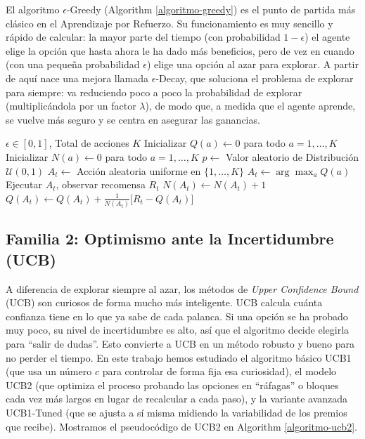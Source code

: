 El algoritmo \(\epsilon\)-Greedy (Algorithm \ref{algoritmo-greedy}) es el punto de
partida más clásico en el Aprendizaje por Refuerzo. Su funcionamiento es
muy sencillo y rápido de calcular: la mayor parte del tiempo (con
probabilidad \(1-\epsilon\)) el agente elige la opción que hasta ahora
le ha dado más beneficios, pero de vez en cuando (con una pequeña
probabilidad \(\epsilon\)) elige una opción al azar para explorar. A
partir de aquí nace una mejora llamada \(\epsilon\)-Decay, que soluciona
el problema de explorar para siempre: va reduciendo poco a poco la
probabilidad de explorar (multiplicándola por un factor \(\lambda\)), de
modo que, a medida que el agente aprende, se vuelve más seguro y se
centra en asegurar las ganancias.

\begin{algorithm}
\caption{Algoritmo $\epsilon$-Greedy para K-Brazos}\label{algoritmo-greedy}
\begin{algorithmic}[1]
\Require $\epsilon \in [0, 1]$, Total de acciones $K$
\State Inicializar $Q(a) \leftarrow 0$ para todo $a=1,\dots, K$
\State Inicializar $N(a) \leftarrow 0$ para todo $a=1,\dots, K$
    \State $p \leftarrow$ Valor aleatorio de Distribución $\mathcal{U}(0, 1)$
        \State $A_t \leftarrow$ Acción aleatoria uniforme en $\{1, \dots, K\}$
    \Else
        \State $A_t \leftarrow \arg\max_a Q(a)$  
    \EndIf
    \State Ejecutar $A_t$, observar recomensa $R_t$
    \State $N(A_t) \leftarrow N(A_t) + 1$
    \State $Q(A_t) \leftarrow Q(A_t) + \frac{1}{N(A_t)} \big[R_t - Q(A_t)\big]$
\EndFor
\end{algorithmic}
\end{algorithm}

\subsection{Familia 2: Optimismo ante la Incertidumbre
(UCB)}\label{familia-2-optimismo-ante-la-incertidumbre-ucb}

A diferencia de explorar siempre al azar, los
métodos de \emph{Upper Confidence Bound} (UCB) son curiosos de forma
mucho más inteligente. UCB calcula cuánta confianza tiene en lo que ya
sabe de cada palanca. Si una opción se ha probado muy poco, su nivel de
incertidumbre es alto, así que el algoritmo decide elegirla para ``salir
de dudas''. Esto convierte a UCB en un método robusto y bueno para no
perder el tiempo. En este trabajo hemos estudiado el algoritmo básico
UCB1 (que usa un número \(c\) para controlar de forma fija esa
curiosidad), el modelo UCB2 (que optimiza el proceso probando las
opciones en ``ráfagas'' o bloques cada vez más largos en lugar de
recalcular a cada paso), y la variante avanzada UCB1-Tuned (que se
ajusta a sí misma midiendo la variabilidad de los premios que recibe).
Mostramos el pseudocódigo de UCB2 en Algorithm \ref{algoritmo-ucb2}.

